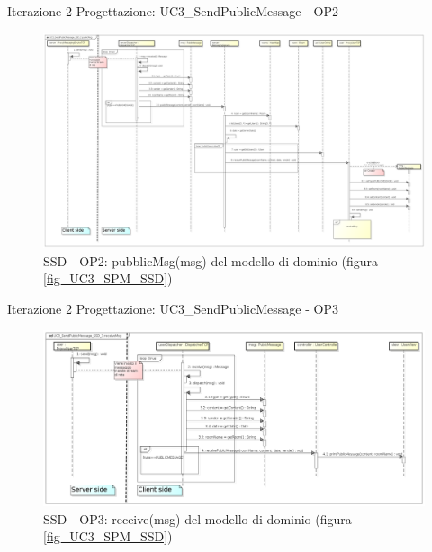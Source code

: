 \documentclass[t]{beamer} %
\begin{document}
\begin{frame} {Iterazione 2 Progettazione: UC3\_SendPublicMessage - OP2}
   \begin{figure}
     \includegraphics[scale=0.14]{image_astah/Iteration_2_DesignModel/UC3_SendPublicMessage_SSD_2_publicMsg.png}{\centering}
     \caption{SSD - OP2: pubblicMsg(msg) del modello di dominio (figura \ref{fig_UC3_SPM_SSD}) }
     \label{fig_UC3_SSD_SRM_2} 
   \end{figure}
\end{frame}

\begin{frame} {Iterazione 2 Progettazione: UC3\_SendPublicMessage - OP3}
   \begin{figure}
     \includegraphics[scale=0.23]{image_astah/Iteration_2_DesignModel/UC3_SendPublicMessage_SSD_3_receiveMsg.png}{\centering}
     \caption{SSD - OP3: receive(msg) del modello di dominio (figura \ref{fig_UC3_SPM_SSD})}
     \label{fig_UC3_SSD_SRM_3} 
   \end{figure}
\end{frame}
\end{document}
